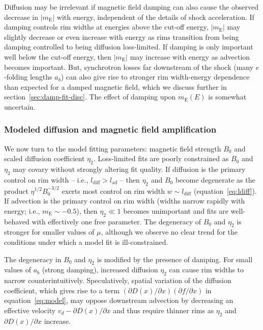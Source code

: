\documentclass[manuscript]{aastex}  %
\newcommand*{\mt}{\mathrm}
\newcommand*{\ptl}{\partial}
\newcommand*{\mE}{m_\mt{E}}
\begin{document}
Diffusion may be irrelevant if magnetic field damping can also cause the
observed decrease in $|\mE|$ with energy, independent of the details of shock
acceleration.  If damping controls rim widths at energies above the cut-off
energy, $|\mE|$ may slightly decrease or even increase with energy as rims
transition from being damping controlled to being diffusion loss-limited.  If
damping is only important well below the cut-off energy, then $|\mE|$ may
increase with energy as advection becomes important.  But, synchrotron
losses far downstream of the shock (many $e$-folding lengths $a_b$) can also
give rise to stronger rim width-energy dependence than expected for a damped
magnetic field, which we discuss further in section~\ref{sec:damp-fit-disc}.
The effect of damping upon $\mE(E)$ is somewhat uncertain.

\subsubsection{Modeled diffusion and magnetic field amplification}

We now turn to the model fitting parameters: magnetic field strength $B_0$ and
scaled diffusion coefficient $\eta_2$.  Loss-limited fits are poorly
constrained as $B_0$ and $\eta_2$ may covary without strongly altering fit
quality.  If diffusion is the primary control on rim width -- i.e.,
$l_{\mt{diff}} > l_{\mt{ad}}$ -- then $\eta_2$ and $B_0$ become degenerate as
the product $\eta^{1/2} B_0^{-3/2}$ exerts most control on rim width $w \sim
l_{\mt{diff}}$ (equation~\eqref{eq:ldiff}).  If advection is the primary
control on rim width (widths narrow rapidly with energy; i.e., $\mE \sim
-0.5$), then $\eta_2 \ll 1$ becomes unimportant and fits are well-behaved with
effectively one free parameter.  The degeneracy of $B_0$ and $\eta_2$ is
stronger for smaller values of $\mu$, although we observe no clear trend for
the conditions under which a model fit is ill-constrained.

The degeneracy in $B_0$ and $\eta_2$ is modified by the presence of damping.
For small values of $a_b$ (strong damping), increased diffusion $\eta_2$ can
cause rim widths to narrow counterintuitively.  Speculatively, spatial
variation of the diffusion coefficient, which gives rise to a
term $(\ptl D(x) / \ptl x) (\ptl f/\ptl x)$ in equation~\eqref{eq:model}, may
oppose downstream advection by decreasing an effective velocity $v_d - \ptl
D(x) / \ptl x$ and thus require thinner rims as $\eta_2$ and $\ptl D(x) / \ptl
x$ increase.
\end{document}
